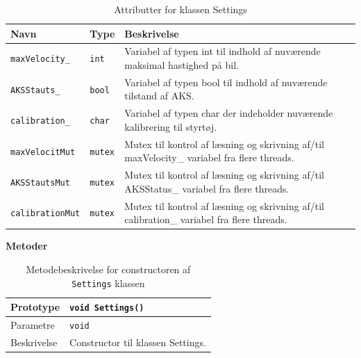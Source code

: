 \begin{table}[h]
\begin{tabularx}{\textwidth}{| L{3cm} | Z | L{10cm} |} \hline
Navn & Type & Beskrivelse \\\hline
\texttt{maxVelocity\_}			& \texttt{int}		&Variabel af typen int til indhold af nuværende maksimal hastighed på bil.\\\hline

\texttt{AKSStauts\_}			& \texttt{bool}		&Variabel af typen bool til indhold af nuværende tilstand af AKS.\\\hline

\texttt{calibration\_}			& \texttt{char}		&Variabel af typen char der indeholder nuværende kalibrering til styrtøj.\\\hline

\texttt{maxVelocitMut}			& \texttt{mutex}	&Mutex til kontrol af læsning og skrivning af/til maxVelocity\_ variabel fra flere threads.\\\hline

\texttt{AKSStautsMut}			& \texttt{mutex}	&Mutex til kontrol af læsning og skrivning af/til AKSStatus\_ variabel fra flere threads.\\\hline

\texttt{calibrationMut}			& \texttt{mutex}	&Mutex til kontrol af læsning og skrivning af/til calibration\_ variabel fra flere threads.\\\hline
\end{tabularx}
\caption{Attributter for klassen Settings}
\label{table:attr_settings}
\end{table}

\clearpage

\textbf{Metoder}

\begin{table}[h]
\begin{tabularx}{\textwidth}{| L{2.5 cm} | Z |} \hline
Prototype 	& \texttt{void Settings()} \\\hline
Parametre 	& \texttt{void} 		\newline \\\hline
Beskrivelse	& Constructor til klassen Settings. \newline \\\hline
\end{tabularx}
\caption{Metodebeskrivelse for constructoren af \texttt{Settings} klassen}
\label{table:met_settings}
\end{table}

